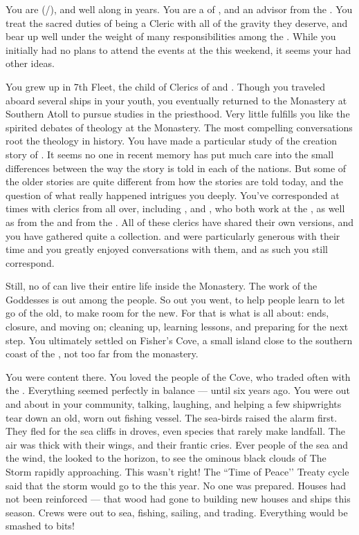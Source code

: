 \documentclass[char]{GL2020}
\begin{document}
\name{\cEbbPriest{}}

You are \cEbbPriest{\full} (\cEbbPriest{\they}/\cEbbPriest{\them}), and well along in years. You are a \cEbbPriest{\cleric} of \cEbbFull{\full}, and an advisor from the \pShip{}. You treat the sacred duties of being a Cleric with all of the gravity they deserve, and bear up well under the weight of many responsibilities among the \pShippies{}. While you initially had no plans to attend the events at the \pSchool{} this weekend, it seems your \cEbb{\Deity} had other ideas.

You grew up in 7th Fleet, the child of Clerics of \cEbb{} and \cFlow{}. Though you traveled aboard several ships in your youth, you eventually returned to the Monastery at Southern Atoll to pursue studies in the priesthood. Very little fulfills you like the spirited debates of theology at the Monastery. The most compelling conversations root the theology in history. You have made a particular study of the creation story of \pEarth{}. It seems no one in recent memory has put much care into the small differences between the way the story is told in each of the nations. But some of the older stories are quite different from how the stories are told today, and the question of what really happened intrigues you deeply. You've corresponded at times with clerics from all over, including \cBeetle{\full}, and \cFlowPriest{\full}, who both work at the \pSchool{}, as well as \cAntiChup{\full} from the \pTech{} and \cHedonist{\full} from the \pFarm{}. All of these clerics have shared their own versions, and you have gathered quite a collection. \cBeetle{} and \cFlowPriest{} were particularly generous with their time and you greatly enjoyed conversations with them, and as such you still correspond. 

Still, no \cEbbPriest{\cleric} of \cEbb{} can live their entire life inside the Monastery. The work of the Goddesses is out among the people. So out you went, to help people learn to let go of the old, to make room for the new. For that is what \cEbb{} is all about: ends, closure, and moving on; cleaning up, learning lessons, and preparing for the next step. You ultimately settled on Fisher’s Cove, a small island close to the southern coast of the \pFarm{}, not too far from the monastery.

You were content there. You loved the people of the Cove, who traded often with the \pFarmers{}. Everything seemed perfectly in balance — until six years ago. You were out and about in your community, talking, laughing, and helping a few shipwrights tear down an old, worn out fishing vessel. The sea-birds raised the alarm first. They fled for the sea cliffs in droves, even species that rarely make landfall. The air was thick with their wings, and their frantic cries. Ever people of the sea and the wind, the \pShip{} looked to the horizon, to see the ominous black clouds of The Storm rapidly approaching. This wasn’t right! The ``Time of Peace’’ Treaty cycle said that the storm would go to the \pTech{} this year. No one was prepared. Houses had not been reinforced — that wood had gone to building new houses and ships this season. Crews were out to sea, fishing, sailing, and trading. Everything would be smashed to bits!
\end{document}
